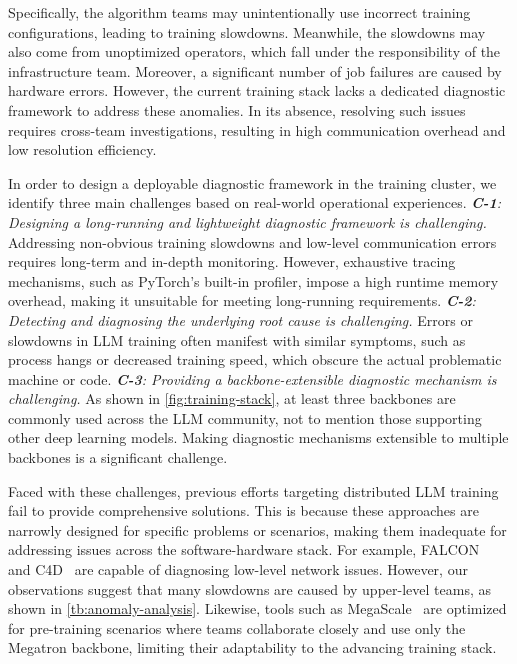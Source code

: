 Specifically, the algorithm teams may unintentionally use incorrect training configurations, leading to training slowdowns. Meanwhile, the slowdowns may also come from unoptimized operators, which fall under the responsibility of the infrastructure team. Moreover, a significant number of job failures are caused by hardware errors. However, the current training stack lacks a dedicated diagnostic framework to address these anomalies. In its absence, resolving such issues requires cross-team investigations, resulting in high communication overhead and low resolution efficiency.


In order to design a deployable diagnostic framework in the training cluster, we identify three main challenges based on real-world operational experiences. \textit{\textbf{C-1}: Designing a long-running and lightweight diagnostic framework is challenging.} Addressing non-obvious training slowdowns and low-level communication errors requires long-term and in-depth monitoring. However, exhaustive tracing mechanisms, such as PyTorch’s built-in profiler, impose a high runtime memory overhead, making it unsuitable for meeting long-running requirements. \textit{\textbf{C-2}: Detecting and diagnosing the underlying root cause is challenging.} Errors or slowdowns in LLM training often manifest with similar symptoms, such as process hangs or decreased training speed, which obscure the actual problematic machine or code. \textit{\textbf{C-3}: Providing a backbone-extensible diagnostic mechanism is challenging.} As shown in \autoref{fig:training-stack}, at least three backbones are commonly used across the LLM community, not to mention those supporting other deep learning models. Making diagnostic mechanisms extensible to multiple backbones is a significant challenge.


Faced with these challenges, previous  efforts\cite{wuFALCONPinpointing,jiangMegaScaleScaling,dongBoostingLargescale} targeting distributed LLM training fail to provide comprehensive solutions. This is because these approaches are narrowly designed for specific problems or scenarios, making them inadequate for addressing issues across the software-hardware stack. For example, FALCON~\cite{wuFALCONPinpointing} and C4D~\cite{dongBoostingLargescale} are capable of diagnosing low-level network issues. However, our observations suggest that many slowdowns are caused by upper-level teams, as shown in \autoref{tb:anomaly-analysis}. Likewise, tools such as MegaScale~\cite{jiangMegaScaleScaling} are optimized for pre-training scenarios where teams collaborate closely and use only the Megatron backbone, limiting their adaptability to the advancing training stack.



